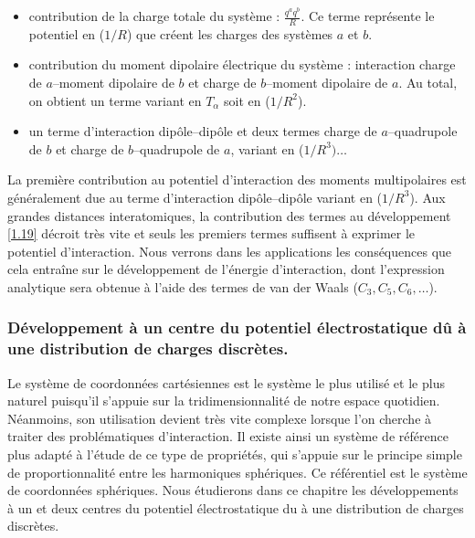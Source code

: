 	\begin{itemize}
		\item contribution de la charge totale du système : $\frac{q^{a}q^{b}}{R}$. Ce terme représente le potentiel en ($1/R$) que créent les charges des systèmes $a$ et $b$.
		\item contribution du moment dipolaire électrique du système : interaction charge de $a$--moment dipolaire de $b$ et charge de $b$--moment dipolaire de $a$. Au total, on obtient un terme variant en $T_{\alpha}$ soit en ($1/R^{2}$).	
		\item un terme d'interaction dipôle--dipôle et deux termes charge de $a$--quadrupole de $b$ et charge de $b$--quadrupole de $a$, variant en ($1/R^{3}) \ldots$
	\end{itemize}
	
	La première contribution au potentiel d'interaction des moments multipolaires est généralement due au terme d'interaction dipôle--dipôle variant en ($1/R^{3}$). Aux grandes distances interatomiques, la contribution des termes au développement \ref{1.19} décroit très vite et seuls les premiers termes suffisent à exprimer le potentiel d'interaction. Nous verrons dans les applications les conséquences que cela entraîne sur le développement de l'énergie d'interaction, dont l'expression analytique sera obtenue à l'aide des termes de van der Waals ($C_{3}, C_{5}, C_{6}, \ldots$).\\
	
	
	\subsubsection{Développement à un centre du potentiel électrostatique dû à une distribution de charges discrètes.}
	
	Le système de coordonnées cartésiennes est le système le plus utilisé et le plus naturel puisqu'il s'appuie sur la tridimensionnalité de notre espace quotidien. Néanmoins, son utilisation devient très vite complexe lorsque l'on cherche à traiter des problématiques d'interaction. Il existe ainsi un système de référence plus adapté à l'étude de ce type de propriétés, qui s'appuie sur le principe simple de proportionnalité entre les harmoniques sphériques. Ce référentiel est le système de coordonnées sphériques. Nous étudierons dans ce chapitre les développements à un et deux centres du potentiel électrostatique du à une distribution de charges discrètes.\\
	
